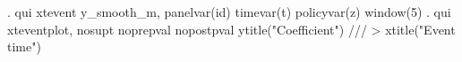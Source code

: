 . qui xtevent y_smooth_m, panelvar(id) timevar(t) policyvar(z) window(5)
{\smallskip}
. qui xteventplot, nosupt noprepval nopostpval ytitle("Coefficient") ///
>         xtitle("Event time")
{\smallskip}
